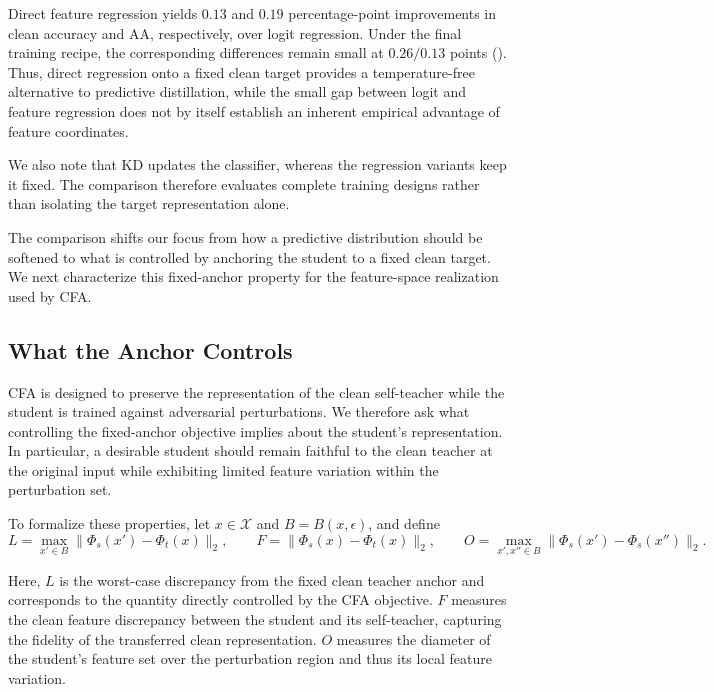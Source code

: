 Direct feature regression yields \(0.13\) and \(0.19\) percentage-point
improvements in clean accuracy and AA, respectively, over logit regression.
Under the final training recipe, the corresponding differences remain small
at \(0.26/0.13\) points ().
Thus, direct regression onto a fixed clean target provides a temperature-free
alternative to predictive distillation, while the small gap between logit and
feature regression does not by itself establish an inherent empirical
advantage of feature coordinates.

We also note that KD updates the classifier, whereas the regression variants
keep it fixed.
The comparison therefore evaluates complete training designs rather than
isolating the target representation alone.

\label{sec:sole_target}

The comparison shifts our focus from how a predictive distribution should be
softened to what is controlled by anchoring the student to a fixed clean
target.
We next characterize this fixed-anchor property for the feature-space
realization used by CFA.


\subsection{What the Anchor Controls}
\label{sec:decomp}

CFA is designed to preserve the representation of the clean self-teacher
while the student is trained against adversarial perturbations.
We therefore ask what controlling the fixed-anchor objective implies about
the student's representation.
In particular, a desirable student should remain faithful to the clean
teacher at the original input while exhibiting limited feature variation
within the perturbation set.

To formalize these properties, let \(x\in\mathcal X\) and
\(B=B(x,\epsilon)\), and define
\begin{equation}
L
=
\max_{x'\in B}
\lVert\Phi_s(x')-\Phi_t(x)\rVert_2,
\qquad
F
=
\lVert\Phi_s(x)-\Phi_t(x)\rVert_2,
\qquad
O
=
\max_{x',x''\in B}
\lVert\Phi_s(x')-\Phi_s(x'')\rVert_2.
\label{eqn:LFO}
\end{equation}

Here, \(L\) is the worst-case discrepancy from the fixed clean teacher anchor
and corresponds to the quantity directly controlled by the CFA objective.
\(F\) measures the clean feature discrepancy between the student and its
self-teacher, capturing the fidelity of the transferred clean representation.
\(O\) measures the diameter of the student's feature set over the perturbation
region and thus its local feature variation.

